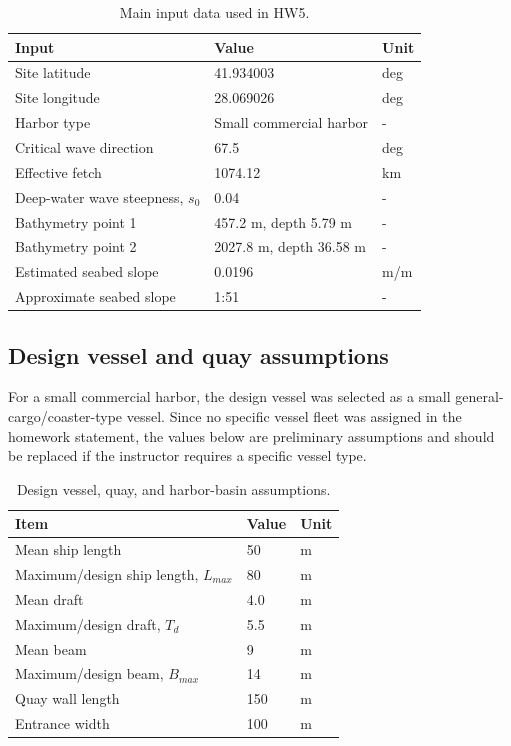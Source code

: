 \documentclass[11pt,a4paper]{article}
\begin{document}
\begin{table}[H]
\centering
\caption{Main input data used in HW5.}
\begin{tabular}{lll}
\toprule
\textbf{Input} & \textbf{Value} & \textbf{Unit} \\
\midrule
Site latitude & 41.934003 & deg \\
Site longitude & 28.069026 & deg \\
Harbor type & Small commercial harbor & - \\
Critical wave direction & 67.5 & deg \\
Effective fetch & 1074.12 & km \\
Deep-water wave steepness, $s_0$ & 0.04 & - \\
Bathymetry point 1 & 457.2 m, depth 5.79 m & - \\
Bathymetry point 2 & 2027.8 m, depth 36.58 m & - \\
Estimated seabed slope & 0.0196 & m/m \\
Approximate seabed slope & 1:51 & - \\
\bottomrule
\end{tabular}
\end{table}

\subsection{Design vessel and quay assumptions}
For a small commercial harbor, the design vessel was selected as a small general-cargo/coaster-type vessel. Since no specific vessel fleet was assigned in the homework statement, the values below are preliminary assumptions and should be replaced if the instructor requires a specific vessel type.

\begin{table}[H]
\centering
\caption{Design vessel, quay, and harbor-basin assumptions.}
\begin{tabular}{lll}
\toprule
\textbf{Item} & \textbf{Value} & \textbf{Unit} \\
\midrule
Mean ship length & 50 & m \\
Maximum/design ship length, $L_{max}$ & 80 & m \\
Mean draft & 4.0 & m \\
Maximum/design draft, $T_d$ & 5.5 & m \\
Mean beam & 9 & m \\
Maximum/design beam, $B_{max}$ & 14 & m \\
Quay wall length & 150 & m \\
Entrance width & 100 & m \\
\bottomrule
\end{tabular}
\end{table}
\end{document}
